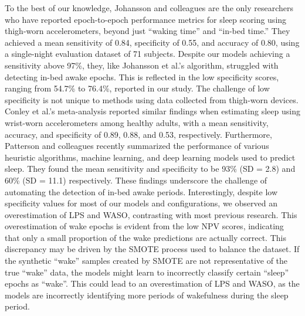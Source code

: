 \documentclass[
  super,
  preprint,
  3p]{elsarticle}
\begin{document}
To the best of our knowledge, Johansson and
colleagues\citep{johansson_development_2023} are the only researchers
who have reported epoch-to-epoch performance metrics for sleep scoring
using thigh-worn accelerometers, beyond just ``waking time'' and
``in-bed time.'' They achieved a mean sensitivity of 0.84, specificity
of 0.55, and accuracy of 0.80, using a single-night evaluation dataset
of 71 subjects. Despite our models achieving a sensitivity above 97\%,
they, like Johansson et al.'s algorithm, struggled with detecting in-bed
awake epochs. This is reflected in the low specificity scores, ranging
from 54.7\% to 76.4\%, reported in our study. The challenge of low
specificity is not unique to methods using data collected from
thigh-worn devices. Conley et al.'s meta-analysis\citep{conley2019}
reported similar findings when estimating sleep using wrist-worn
accelerometers among healthy adults, with a mean sensitivity, accuracy,
and specificity of 0.89, 0.88, and 0.53, respectively. Furthermore,
Patterson and colleagues\citep{patterson_40_2023} recently summarized
the performance of various heuristic algorithms, machine learning, and
deep learning models used to predict sleep. They found the mean
sensitivity and specificity to be 93\% (SD = 2.8) and 60\% (SD = 11.1)
respectively. These findings underscore the challenge of automating the
detection of in-bed awake periods. Interestingly, despite low
specificity values for most of our models and configurations, we
observed an overestimation of LPS and WASO, contrasting with most
previous research\citep{conley2019, palotti2019}. This overestimation of
wake epochs is evident from the low NPV scores, indicating that only a
small proportion of the wake predictions are actually correct. This
discrepancy may be driven by the SMOTE process used to balance the
dataset. If the synthetic ``wake'' samples created by SMOTE are not
representative of the true ``wake'' data, the models might learn to
incorrectly classify certain ``sleep'' epochs as ``wake''. This could
lead to an overestimation of LPS and WASO, as the models are incorrectly
identifying more periods of wakefulness during the sleep period.
\end{document}
